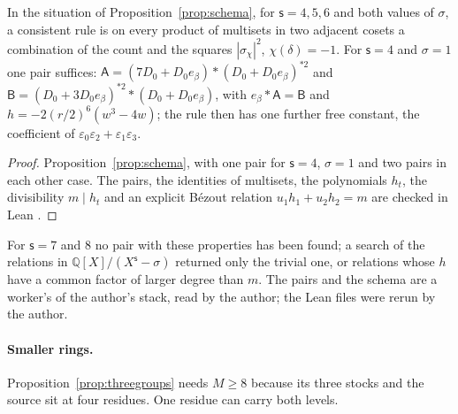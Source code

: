 \begin{theorem}\label{thm:fgfoursix}
In the situation of Proposition~\ref{prop:schema}, for $\mathsf{s}=4,5,6$ and both values of $\sigma$, a consistent rule is on every product of multisets in two adjacent cosets a combination of the count and the squares $|\sigma_\chi|^{2}$, $\chi(\delta)=-1$. For $\mathsf{s}=4$ and $\sigma=1$ one pair suffices: $\mathsf{A}=(7D_0+D_0e_\beta)*(D_0+D_0e_\beta)^{*2}$ and $\mathsf{B}=(D_0+3D_0e_\beta)^{*2}*(D_0+D_0e_\beta)$, with $e_\beta*\mathsf{A}=\mathsf{B}$ and $h=-2(r/2)^{6}(w^{3}-4w)$; the rule then has one further free constant, the coefficient of $\varepsilon_0\varepsilon_2+\varepsilon_1\varepsilon_3$.
\end{theorem}
\begin{proof}
Proposition~\ref{prop:schema}, with one pair for $\mathsf{s}=4$, $\sigma=1$ and two pairs in each other case. The pairs, the identities of multisets, the polynomials $h_t$, the divisibility $m\mid h_t$ and an explicit B\'ezout relation $u_1h_1+u_2h_2=m$ are checked in Lean \cite{comptp}.
\end{proof}

For $\mathsf{s}=7$ and $8$ no pair with these properties has been found; a search of the relations in $\mathbb{Q}[X]/(X^{\mathsf{s}}-\sigma)$ returned only the trivial one, or relations whose $h$ have a common factor of larger degree than $m$. The pairs and the schema are a worker's of the author's stack, read by the author; the Lean files were rerun by the author.

\paragraph{Smaller rings.} Proposition~\ref{prop:threegroups} needs $M\ge8$ because its three stocks and the source sit at four residues. One residue can carry both levels.

